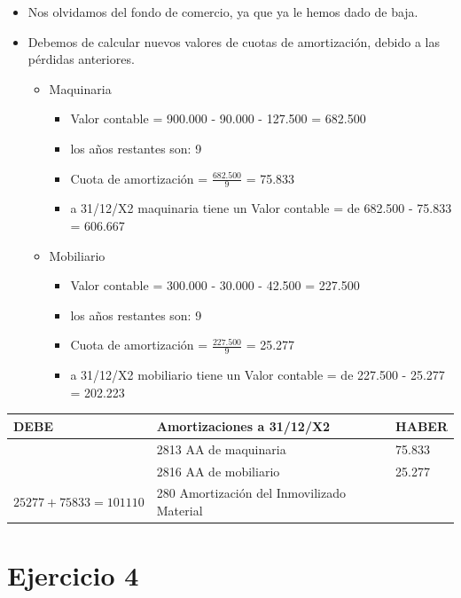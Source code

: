 \documentclass[a4paper,12pt]{article}
\newcommand{\fec}{31/12/}
\newcommand{\VC}{Valor contable = }
\newcommand{\cuotaamort}{Cuota de amortización = }
\newcommand{\myequation}[2]{\ensuremath{\frac{#1}{#2}}}
\begin{document}
\begin{itemize}
    \item Nos olvidamos del fondo de comercio, ya que ya le hemos dado de baja.
    \item Debemos de calcular nuevos valores de cuotas de amortización, debido a las pérdidas anteriores.
    \begin{itemize}
        \item Maquinaria
        \begin{itemize}
            \item \VC 900.000 - 90.000 - 127.500 = 682.500
            \item los años restantes son: 9
            \item \cuotaamort \myequation{682.500}{9} = 75.833
            \item a \fec X2 maquinaria tiene un \VC de 682.500 - 75.833 = 606.667  
        \end{itemize}
        \item Mobiliario
        \begin{itemize}
            \item \VC 300.000 - 30.000 - 42.500 = 227.500
            \item los años restantes son: 9
            \item \cuotaamort \myequation{227.500}{9} = 25.277
            \item a \fec X2 mobiliario tiene un \VC de 227.500 - 25.277 = 202.223
        \end{itemize}
    \end{itemize}
\end{itemize}


\begin{table}[H]
    \centering
    \begin{tabular}{|p{3cm}|p{6cm}|p{3cm}|}
    \hline
    \textbf{DEBE} & \textbf{Amortizaciones a \fec X2} & \textbf{HABER} \\
    \hline
    & 2813 AA de maquinaria& 75.833\\
    \hline
    & 2816 AA de mobiliario& 25.277\\
    \hline
    $25277+75833=101110$& 280 Amortización del Inmovilizado Material& \\
    \hline
    \end{tabular}
\end{table}

\section{Ejercicio 4}
\end{document}
